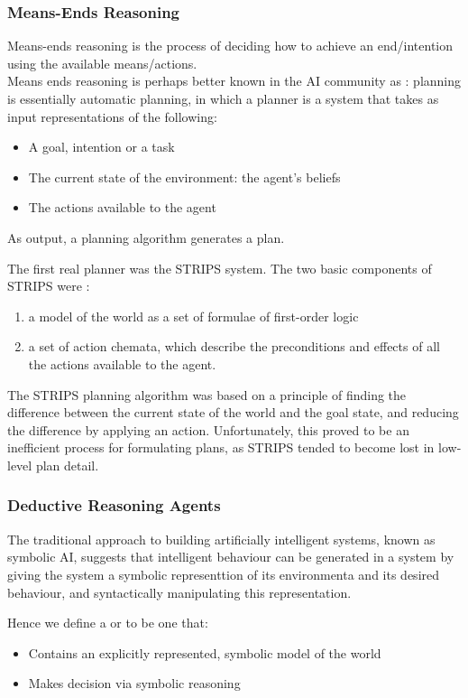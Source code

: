 \subsubsection{Means-Ends Reasoning}
Means-ends reasoning is the process of deciding how to achieve an end/intention using the available means/actions.\\
Means ends reasoning is perhaps better known in the AI community as : planning is essentially automatic planning, in which a planner is a system that takes as input representations of the following:
\begin{itemize}
\item A goal, intention or a task
\item The current state of the environment: the agent's beliefs
\item The actions available to the agent
\end{itemize}
As output, a planning algorithm generates a plan.

The first real planner was the STRIPS system. The two basic components of STRIPS were :
\begin{enumerate}
\item a model of the world as a set of formulae of first-order logic 
\item a set of action chemata, which describe the preconditions and effects of all the actions available to the agent.
\end{enumerate}
The STRIPS planning algorithm was based on a principle of finding the difference between the current state of the world and the goal state, and reducing the difference by applying an action. Unfortunately, this proved to be an inefficient process for formulating plans, as STRIPS tended to become lost in low-level plan detail.
\subsubsection{Deductive Reasoning Agents}
The traditional approach to building artificially intelligent systems, known as symbolic AI, suggests that intelligent behaviour can be generated in a system by giving the system a symbolic representtion of its environmenta and its desired behaviour, and syntactically manipulating this representation.

Hence we define a  or  to be one that:
\begin{itemize}
\item Contains an explicitly represented, symbolic model of the world
\item Makes decision via symbolic reasoning
\end{itemize}

